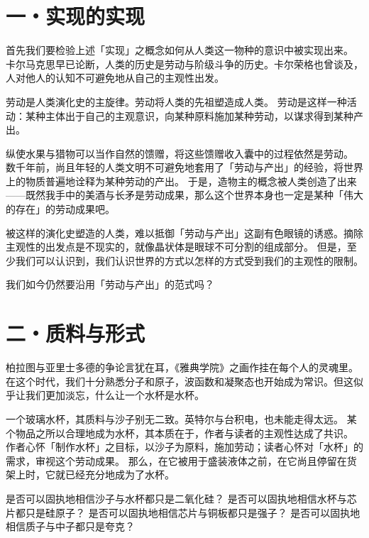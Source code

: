 





\section*{一・实现的实现}

首先我们要检验上述「实现」之概念如何从人类这一物种的意识中被实现出来。
卡尔马克思早已论断，人类的历史是劳动与阶级斗争的历史。卡尔荣格也曾谈及，人对他人的认知不可避免地从自己的主观性出发。

劳动是人类演化史的主旋律。劳动将人类的先祖塑造成人类。
劳动是这样一种活动：某种主体出于自己的主观意识，向某种原料施加某种劳动，以谋求得到某种产出。
\clearpage

纵使水果与猎物可以当作自然的馈赠，将这些馈赠收入囊中的过程依然是劳动。
数千年前，尚且年轻的人类文明不可避免地套用了「劳动与产出」的经验，将世界上的物质普遍地诠释为某种劳动的产出。
于是，造物主的概念被人类创造了出来——既然我手中的美酒与长矛是劳动成果，那么这个世界本身也一定是某种「伟大的存在」的劳动成果吧。

被这样的演化史塑造的人类，难以抵御「劳动与产出」这副有色眼镜的诱惑。摘除主观性的出发点是不现实的，就像晶状体是眼球不可分割的组成部分。
但是，至少我们可以认识到，我们认识世界的方式以怎样的方式受到我们的主观性的限制。

我们如今仍然要沿用「劳动与产出」的范式吗？
\clearpage






\section*{二・质料与形式}

柏拉图与亚里士多德的争论言犹在耳，《雅典学院》之画作挂在每个人的灵魂里。
在这个时代，我们十分熟悉分子和原子，波函数和凝聚态也开始成为常识。但这似乎让我们更加淡忘，什么让一个水杯是水杯。

一个玻璃水杯，其质料与沙子别无二致。英特尔与台积电，也未能走得太远。
某个物品之所以合理地成为水杯，其本质在于，作者与读者的主观性达成了共识。
作者心怀「制作水杯」之目标，以沙子为原料，施加劳动；读者心怀对「水杯」的需求，审视这个劳动成果。
那么，在它被用于盛装液体之前，在它尚且停留在货架上时，它就已经充分地成为了水杯。
\clearpage

是否可以固执地相信沙子与水杯都只是二氧化硅？
是否可以固执地相信水杯与芯片都只是硅原子？
是否可以固执地相信芯片与铜板都只是强子？
是否可以固执地相信质子与中子都只是夸克？

